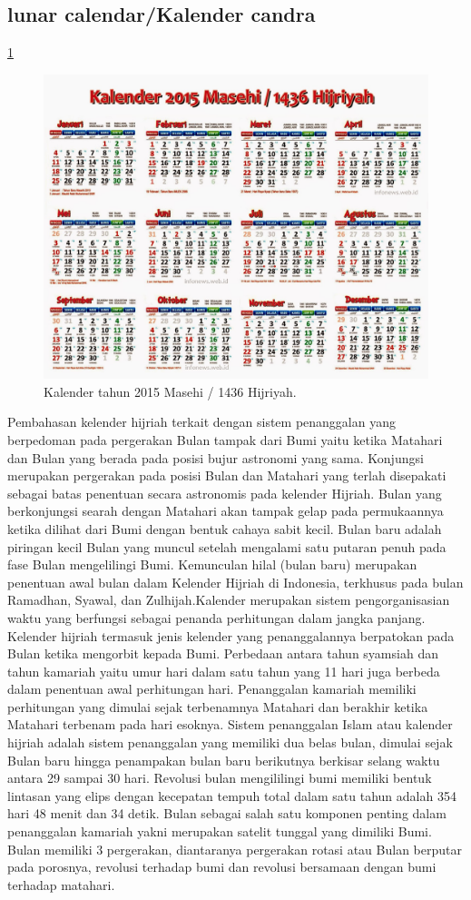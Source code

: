   \subsection{lunar calendar/Kalender candra}
    \ref{Kalender_2015}
    \begin{figure}[ht]
    \centerline{\includegraphics[width=.5\textwidth]{figures/Kalender_2015.JPG}}
    \caption{Kalender tahun 2015 Masehi / 1436 Hijriyah.}
    \label{Kalender_2015}
    \end{figure}
    Pembahasan kelender hijriah terkait dengan sistem penanggalan yang berpedoman pada pergerakan Bulan tampak dari Bumi yaitu ketika Matahari dan Bulan yang berada pada posisi bujur astronomi yang sama. Konjungsi merupakan pergerakan pada posisi Bulan dan Matahari yang terlah disepakati sebagai batas penentuan secara astronomis pada kelender Hijriah.
  Bulan yang berkonjungsi searah dengan Matahari akan tampak gelap pada permukaannya ketika dilihat dari Bumi dengan bentuk cahaya sabit kecil. Bulan baru adalah piringan kecil Bulan yang muncul setelah mengalami satu putaran penuh pada fase Bulan mengelilingi Bumi.
  Kemunculan hilal (bulan baru) merupakan penentuan awal bulan dalam Kelender Hijriah di Indonesia, terkhusus pada bulan Ramadhan, Syawal, dan Zulhijah.Kalender merupakan sistem pengorganisasian waktu yang berfungsi sebagai penanda perhitungan dalam jangka panjang. Kelender hijriah termasuk jenis kelender yang penanggalannya berpatokan pada Bulan ketika mengorbit kepada Bumi.
  Perbedaan antara tahun syamsiah dan tahun kamariah yaitu umur hari dalam satu tahun yang 11 hari juga berbeda dalam penentuan awal perhitungan hari. Penanggalan kamariah memiliki perhitungan yang dimulai sejak terbenamnya Matahari dan berakhir ketika Matahari terbenam pada hari esoknya.
  Sistem penanggalan Islam atau kalender hijriah adalah sistem penanggalan yang memiliki dua belas bulan, dimulai sejak Bulan baru hingga penampakan bulan baru berikutnya berkisar selang waktu antara 29 sampai 30 hari. Revolusi bulan mengililingi bumi memiliki bentuk lintasan yang elips dengan kecepatan tempuh total dalam satu tahun adalah 354 hari 48 menit dan 34 detik.
  Bulan sebagai salah satu komponen penting dalam penanggalan kamariah yakni merupakan satelit tunggal yang dimiliki Bumi. Bulan memiliki 3 pergerakan, diantaranya pergerakan rotasi atau Bulan berputar pada porosnya, revolusi terhadap bumi dan revolusi bersamaan dengan bumi terhadap matahari.

